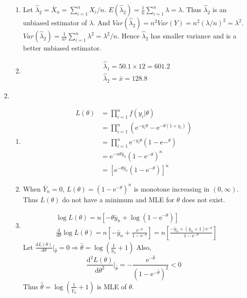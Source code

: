\documentclass{article}
\begin{document}
\begin{enumerate}[leftmargin = 0 em, label = \arabic*., font = \bfseries]
\begin{enumerate}
		\item 
		Let $\hat{\lambda}_2 = \bar{X}_n = \sum_{i=1}^n X_i / n$. $E(\hat{\lambda}_2) = \frac{1}{n} \sum_{i=1}^n \lambda = \lambda$. Thus $\hat{\lambda}_2$ is an unbiased estimator of $\lambda$. And $Var(\hat{\lambda}_2) = n^2 Var(Y) = n^2 (\lambda / n)^2 = \lambda^2$. $Var(\hat{\lambda}_2) = \frac{1}{n^2} \sum_{i=1}^n \lambda^2 = \lambda^2 / n$. Hence $\hat{\lambda}_2$ has smaller variance and is a better unbiased estimator.

		\item 
		\begin{align*}
		& \hat{\lambda}_1 = 50.1 \times 12 = 601.2\\
		& \hat{\lambda}_2 = \bar{x} = 128.8
		\end{align*}
		
	\end{enumerate}

	\item 
	\begin{enumerate}
		\item 
		\begin{align*}
		L(\theta) & = \prod_{i=1}^n f(y_i | \theta)\\
		& = \prod_{i=1}^n (\mathrm{e}^{-y_i \theta} - \mathrm{e}^{-\theta (1 + y_i)})\\
		& = \prod_{i=1}^n \mathrm{e}^{-y_i \theta} (1 - \mathrm{e}{-^\theta})\\
		& = \mathrm{e}^{-n \theta \bar{y}_n} (1 - \mathrm{e}^{-\theta})^n\\
		& = \left[\mathrm{e}^{-\theta \bar{y}_n} (1 - \mathrm{e}^{-\theta})\right]^n
		\end{align*}


		\item 
				When $\bar{Y}_n = 0$, $L(\theta) = (1 - \mathrm{e}^{-\theta})^n$ is monotone increasing in $(0 , \infty)$. Thus $L(\theta)$ do not have a minimum and MLE for $\theta$ does not exist.

		\item 
		\begin{align*}
		& \log L(\theta) = n\left[- \theta \bar{y}_n + \log(1 - \mathrm{e}^{-\theta})\right]\\
		&\frac{\mathrm{d}}{\mathrm{d}\theta}\log L(\theta) = n\left[- \bar{y}_n + \frac{\mathrm{e}^{-\theta}}{1 - \mathrm{e}^{-\theta}}\right] = n\left[\frac{- \bar{y}_n + (\bar{y}_n +1) \mathrm{e}^{-\theta}}{1 - \mathrm{e}^{-\theta}}\right]
		\end{align*}
		Let $\frac{\mathrm{d}L(\theta)}{\mathrm{d}\theta} \big|_{\hat{\theta}}= 0 \Rightarrow \hat{\theta} = \log(\frac{1}{\bar{y}_n} +1)$
		Also,
		\[\frac{\mathrm{d}^2 L(\theta)}{\mathrm{d}\theta^2} \big|_{\hat{\theta}}= - \frac{\mathrm{e}^{-\hat{\theta}}}{(1 - \mathrm{e}^{-\hat{\theta}})^2} < 0\]
		Thus $\hat{\theta} = \log(\frac{1}{\bar{Y}_n} + 1)$ is MLE of $\theta$.
		


\end{enumerate}
\end{enumerate}
\end{document}
